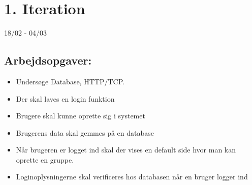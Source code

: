 \section{1. Iteration}
18/02 - 04/03

\subsection{Arbejdsopgaver:}
\begin{itemize}
    \item Undersøge Database, HTTP/TCP. 
    \item Der skal laves en login funktion
    \item Brugere skal kunne oprette sig i systemet 
    \item Brugerens data skal gemmes på en database
    \item Når brugeren er logget ind skal der vises en default side hvor man kan oprette en gruppe.
    \item Loginoplysningerne skal verificeres hos databasen når en bruger logger ind

\end{itemize}



